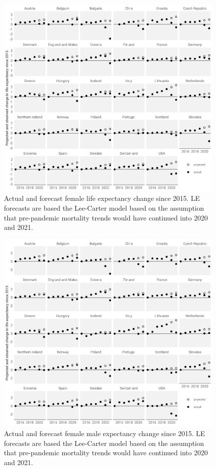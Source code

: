 \documentclass[12pt]{article}
\begin{document}
\begin{figure}[ht!]
    \centering
    \includegraphics{figure-a2.pdf}
    \caption{Actual and forecast female life expectancy change since 2015. LE forecasts are based the Lee-Carter model based on the assumption that pre-pandemic mortality trends would have continued into 2020 and 2021.}
    \label{fig:figure-a2}
\end{figure}

\begin{figure}[ht!]
    \centering
    \includegraphics{figure-a3.pdf}
    \caption{Actual and forecast female male expectancy change since 2015. LE forecasts are based the Lee-Carter model based on the assumption that pre-pandemic mortality trends would have continued into 2020 and 2021.}
    \label{fig:figure-a3}
\end{figure}
\end{document}
